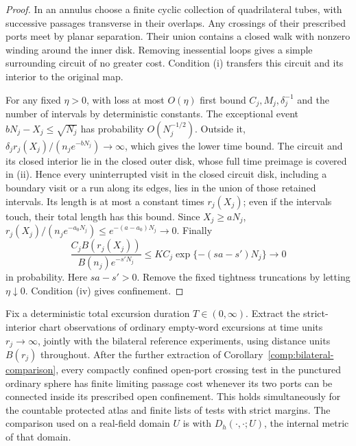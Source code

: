 \begin{proof}
In an annulus choose a finite cyclic collection of quadrilateral tubes,
with successive passages transverse in their overlaps.  Any crossings of
their prescribed ports meet by planar separation.  Their union contains a
closed walk with nonzero winding around the inner disk.  Removing
inessential loops gives a simple surrounding circuit of no greater cost.
Condition (i) transfers this circuit and its interior to the original
map.

For any fixed $\eta>0$, with loss at most $O(\eta)$ first bound
$C_j,M_j,\delta_j^{-1}$ and the number of intervals by deterministic
constants.  The exceptional event $bN_j-X_j\le\sqrt{N_j}$ has probability
$O(N_j^{-1/2})$.  Outside it,
$\delta_j r_j(X_j)/(n_j e^{-bN_j})\to\infty$, which gives the lower time
bound.  The circuit and its closed interior lie in the closed outer
disk, whose full time preimage is covered in (ii).  Hence every
uninterrupted visit in the closed circuit disk, including a boundary
visit or a run along its edges, lies in the union of those retained
intervals.  Its length is at most a constant times $r_j(X_j)$; even if
the intervals touch, their total length has this bound.  Since $X_j\ge aN_j$,
$r_j(X_j)/(n_j e^{-a_0N_j})\le e^{-(a-a_0)N_j}\to0$.
Finally
\[
 \frac{C_jB(r_j(X_j))}{B(n_j)e^{-s'N_j}}
 \le K C_j\exp\{-(sa-s')N_j\}\longrightarrow0
\]
in probability.  Here $sa-s'>0$.  Remove the fixed tightness truncations
by letting $\eta\downarrow0$.  Condition (iv) gives confinement.
\end{proof}

\begin{lemma}
\label{view:sphere-port-costs}
Fix a deterministic total excursion duration $T\in(0,\infty)$.
Extract the strict-interior chart observations of ordinary empty-word
excursions at time units $r_j\to\infty$, jointly with the bilateral
reference experiments, using distance units $B(r_j)$ throughout.
After the further extraction of
Corollary~\ref{comp:bilateral-comparison}, every compactly confined
open-port crossing test in the punctured ordinary sphere has finite
limiting passage cost whenever its two ports can be connected inside
its prescribed open confinement.  This holds simultaneously for the
countable protected atlas and finite lists of tests with strict margins.
The comparison used on a real-field domain $U$ is with
$D_h(\cdot,\cdot;U)$, the internal metric of that domain.
\end{lemma}

